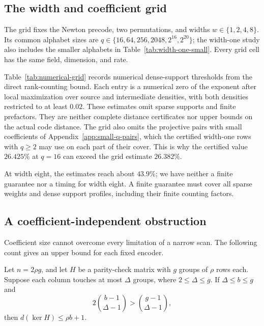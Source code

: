 \subsection{The width and coefficient grid}

The grid fixes the Newton precode, two permutations, and widths
$w\in\{1,2,4,8\}$. Its common alphabet sizes are
$q\in\{16,64,256,2048,2^{16},2^{20}\}$; the width-one study also
includes the smaller alphabets in Table~\ref{tab:width-one-small}.
Every grid cell has the same field, dimension, and rate.

Table~\ref{tab:numerical-grid} records numerical dense-support thresholds
from the direct rank-counting bound. Each entry is a numerical zero of the
exponent after local maximization over source and intermediate densities,
with both densities restricted to at least $0.02$. These estimates omit
sparse supports and finite prefactors. They are neither complete distance
certificates nor upper bounds on the actual code distance. The grid also
omits the projective pairs with small coefficients of
Appendix~\ref{app:small-q-pairs}, which the certified width-one rows with
$q\ge2$ may use on each part of their cover. This is why the certified
value $26.425\%$ at $q=16$ can exceed the grid estimate $26.382\%$.

\begin{table}[t]
\centering
\caption{Numerical dense-support thresholds, as percentages of output length.
These estimates have no certified finite setup-failure margin. Proved
finite guarantees and measured times appear separately in
Tables~\ref{tab:width-one-small} and~\ref{tab:wide-measured}.}
\label{tab:numerical-grid}
\setlength{\tabcolsep}{8pt}

\end{table}

At width eight, the estimates reach about $43.9\%$; we have neither a
finite guarantee nor a timing for width eight. A finite guarantee must
cover all sparse weights and dense support profiles, including their
finite counting factors.

\subsection{A coefficient-independent obstruction}\label{sec:group-ceiling}

Coefficient size cannot overcome every limitation of a narrow scan.
The following count gives an upper bound for each fixed encoder.

\begin{lemma}\label{lem:check-group-ceiling}
Let $n=2\rho g$, and let $H$ be a parity-check matrix with $g$ groups of
$\rho$ rows each. Suppose each column touches at most $\Delta$ groups,
where $2\le\Delta\le g$. If $\Delta\le b\le g$ and
\begin{equation}\label{eq:group-ceiling-condition}
 2\binom{b-1}{\Delta-1}>\binom{g-1}{\Delta-1},
\end{equation}
then $d(\ker H)\le\rho b+1$.
\end{lemma}

